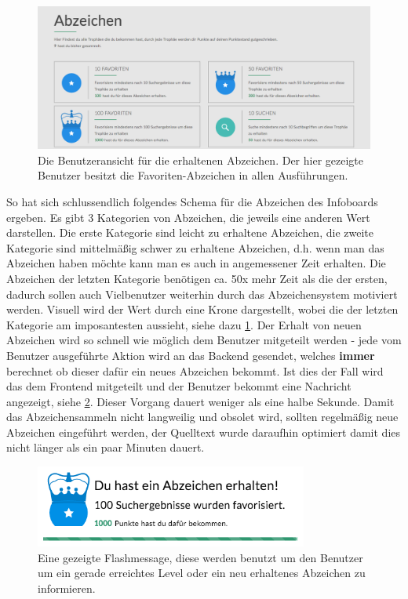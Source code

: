 \documentclass[12pt,twoside]{book}
\begin{document}
\begin{figure}[h]
    \centering
    \includegraphics[width=1.0\textwidth]{images/infoboard_badges.png}
    \caption{Die Benutzeransicht für die erhaltenen Abzeichen. Der hier gezeigte Benutzer besitzt die Favoriten-Abzeichen in allen Ausführungen.}
    \label{fig:badges}
\end{figure}

So hat sich schlussendlich folgendes Schema für die Abzeichen des Infoboards ergeben. Es gibt 3 Kategorien von Abzeichen, die jeweils eine anderen Wert darstellen. Die erste Kategorie sind leicht zu erhaltene Abzeichen, die zweite Kategorie sind mittelmäßig schwer zu erhaltene Abzeichen, d.h. wenn man das Abzeichen haben möchte kann man es auch in angemessener Zeit erhalten. Die Abzeichen der letzten Kategorie benötigen ca. 50x mehr Zeit als die der ersten, dadurch sollen auch Vielbenutzer weiterhin durch das Abzeichensystem motiviert werden. Visuell wird der Wert durch eine Krone dargestellt, wobei die der letzten Kategorie am imposantesten aussieht, siehe dazu \ref{fig:badges}.
Der Erhalt von neuen Abzeichen wird so schnell wie möglich dem Benutzer mitgeteilt werden - jede vom Benutzer ausgeführte Aktion wird an das Backend gesendet, welches \textbf{immer} berechnet ob dieser dafür ein neues Abzeichen bekommt. Ist dies der Fall wird das dem Frontend mitgeteilt und der Benutzer bekommt eine Nachricht angezeigt, siehe \ref{fig:flashmessage}. Dieser Vorgang dauert weniger als eine halbe Sekunde.
Damit das Abzeichensammeln nicht langweilig und obsolet wird, sollten regelmäßig neue Abzeichen eingeführt werden, der Quelltext wurde daraufhin optimiert damit dies nicht länger als ein paar Minuten dauert.

\begin{figure}[h]
    \centering
    \includegraphics[width=0.8\textwidth]{images/infoboard_flashmessage.png}
    \caption{Eine gezeigte Flashmessage, diese werden benutzt um den Benutzer um ein gerade erreichtes Level oder ein neu erhaltenes Abzeichen zu informieren.}
    \label{fig:flashmessage}
\end{figure}
\end{document}
